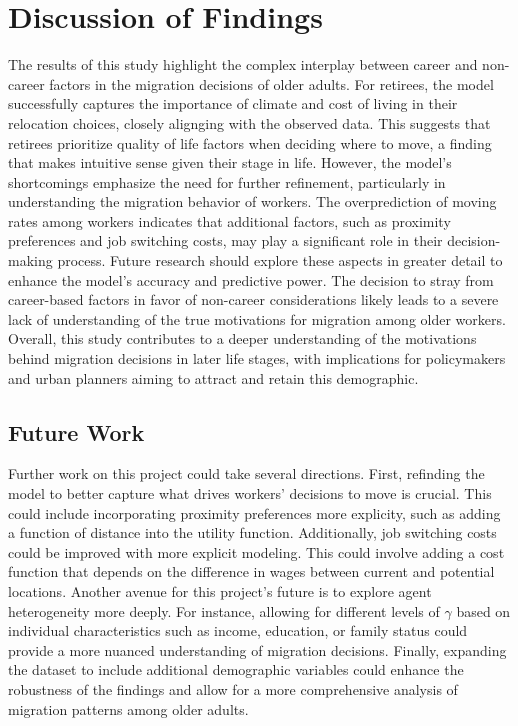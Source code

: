 \documentclass[11pt,a4paper]{article}
\begin{document}
\section{Discussion of Findings}
\label{sec:discussion}

The results of this study highlight the complex interplay between career and non-career factors in the migration decisions of older adults. For retirees, the model successfully captures the importance of climate and cost of living in their relocation choices, closely alignging with the observed data. This suggests that retirees prioritize quality of life factors when deciding where to move, a finding that makes intuitive sense given their stage in life. However, the model's shortcomings emphasize the need for further refinement, particularly in understanding the migration behavior of workers. The overprediction of moving rates among workers indicates that additional factors, such as proximity preferences and job switching costs, may play a significant role in their decision-making process. Future research should explore these aspects in greater detail to enhance the model's accuracy and predictive power. The decision to stray from career-based factors in favor of non-career considerations likely leads to a severe lack of understanding of the true motivations for migration among older workers. Overall, this study contributes to a deeper understanding of the motivations behind migration decisions in later life stages, with implications for policymakers and urban planners aiming to attract and retain this demographic.

\subsection{Future Work}
\label{subsec:future_work}

Further work on this project could take several directions. First, refinding the model to better capture what drives workers' decisions to move is crucial. This could include incorporating proximity preferences more explicity, such as adding a function of distance into the utility function. Additionally, job switching costs could be improved with more explicit modeling. This could involve adding a cost function that depends on the difference in wages between current and potential locations. Another avenue for this project's future is to explore agent heterogeneity more deeply. For instance, allowing for different levels of $\gamma$ based on individual characteristics such as income, education, or family status could provide a more nuanced understanding of migration decisions. Finally, expanding the dataset to include additional demographic variables could enhance the robustness of the findings and allow for a more comprehensive analysis of migration patterns among older adults.
\end{document}
